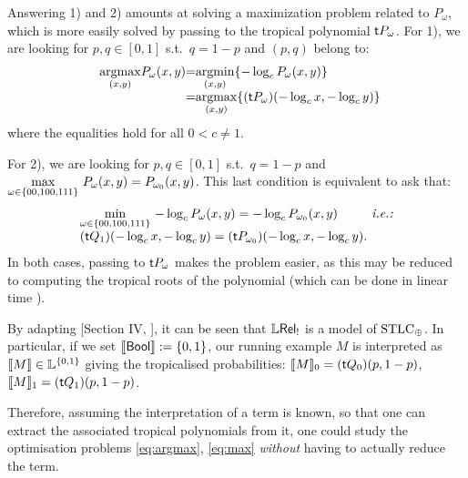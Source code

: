 Answering 1) and 2) amounts at solving a maximization problem related to $P_{\omega}$, which is more easily solved by 
passing to the tropical polynomial $\mathsf{t} P_{\omega}$. 
For 1), we are looking for $p,q\in[0,1]$ s.t.\ $q=1-p$ and $(p,q)$ belong to:
\begin{equation}
  \begin{array}{r@{}c@{}l@{}}
   \underset{(x,y)}{\RM{arg max}} P_\omega (x,y)
   & = &
   \underset{(x,y)}{\RM{arg min}}\set{-\log_c P_\omega (x,y)}
   \\
   & = &
   \underset{(x,y)}{\RM{arg max}}\set{(\trop P_\omega) (-\log_c x,-\log_c y)} \label{eq:argmax}
  \end{array}
\end{equation}
where the equalities hold for all $0<c\neq1$.

For 2), %
we are looking for $p,q\in[0,1]$ s.t.\ $q=1-p$ and
$\max\limits_{\omega\in\{00,100,111\}} \, P_\omega(x,y) = P_{\omega_0}(x,y)$.
This last condition is equivalent to ask that:
\begin{equation}
  \begin{array}{l@{}l@{}}
    \min\limits_{\omega\in\set{00,100,111}} \, -\log_c P_\omega(x,y) = -\log_c P_{\omega_0}(x,y)
   & \textit{ i.e.: }
   \\
   (\trop Q_1)( -\log_c x, -\log_c y) = (\trop P_{\omega_0})( -\log_c x, -\log_c y). &  \label{eq:max}
  \end{array}
\end{equation}
In both cases, passing to $\mathsf{t} P_{\omega}$ makes the problem easier, as this may be reduced to computing the tropical roots of the polynomial (which can be done in linear time \cite{Noferini2015}). %

\begin{remark}
 By adapting [Section IV, \cite{Manzo2013}], it can be seen that $\mathbb{L} \mathsf{Rel}_!$ is a model of $\mathrm{STLC}_\oplus$.
 In particular, if we set $\llbracket\mathsf{Bool}\rrbracket:=\{0,1\}$, our running example $M$ is interpreted as $\llbracket M\rrbracket\in\mathbb{L}^{\{0,1\}}$ giving the tropicalised probabilities: $\llbracket M\rrbracket_0=(\mathsf{t} Q_0)(p,1-p)$, $\llbracket M\rrbracket_1=(\mathsf{t} Q_1)(p,1-p)$.
\end{remark}

Therefore, assuming the interpretation of a term is known, 
so that one can extract the associated tropical polynomials from it,
one could study the optimisation problems \ref{eq:argmax}, \ref{eq:max} \emph{without} having to actually reduce the term. 


